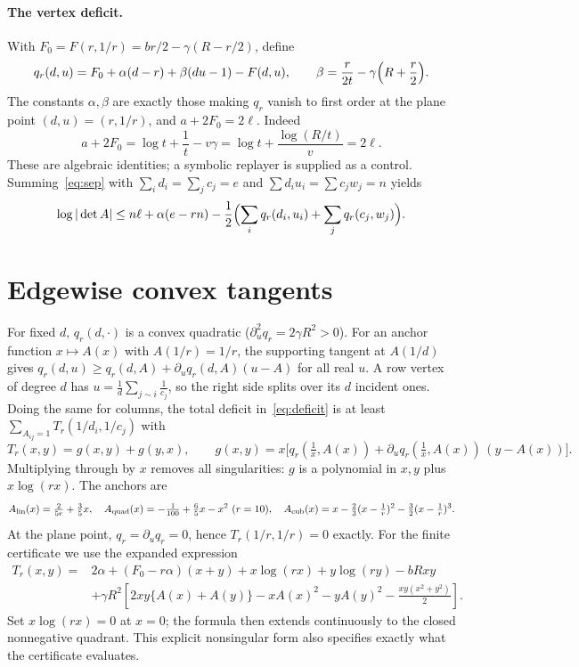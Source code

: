 \documentclass[11pt]{article}
\theoremstyle{remark}
\begin{document}
\paragraph{The vertex deficit.} With
$F_0=F(r,1/r)=br/2-\gamma(R-r/2)$, define
\[
q_r(d,u)=F_0+\alpha(d-r)+\beta(du-1)-F(d,u),\qquad \beta=\frac r{2t}-\gamma\Bigl(R+\frac r2\Bigr).
\]
The constants $\alpha,\beta$ are exactly those making $q_r$ vanish to first order at the plane point
$(d,u)=(r,1/r)$, and $a+2F_0=2\ell$. Indeed
\[
 a+2F_0=\log t+\frac1t-v\gamma
       =\log t+\frac{\log(R/t)}v=2\ell.
\]
These are algebraic identities; a symbolic replayer is supplied as a control.
Summing~\eqref{eq:sep} with $\sum_id_i=\sum_jc_j=e$ and $\sum d_iu_i=\sum c_jw_j=n$ yields
\begin{equation}\label{eq:deficit}
\log|\det A|\le n\ell+\alpha(e-rn)-\frac12\Bigl(\sum_iq_r(d_i,u_i)+\sum_jq_r(c_j,w_j)\Bigr).
\end{equation}

\section{Edgewise convex tangents}
For fixed $d$, $q_r(d,\cdot)$ is a convex quadratic ($\partial_u^2q_r=2\gamma R^2>0$). For an anchor function
$x\mapsto A(x)$ with $A(1/r)=1/r$, the supporting tangent at $A(1/d)$ gives
$q_r(d,u)\ge q_r(d,A)+\partial_uq_r(d,A)(u-A)$ for all real $u$. A row vertex of degree $d$ has
$u=\frac1d\sum_{j\sim i}\frac1{c_j}$, so the right side splits over its $d$ incident ones. Doing the same for
columns, the total deficit in~\eqref{eq:deficit} is at least $\sum_{A_{ij}=1}T_r(1/d_i,1/c_j)$ with
\[
T_r(x,y)=g(x,y)+g(y,x),\qquad g(x,y)=x\bigl[q_r(\tfrac1x,A(x))+\partial_uq_r(\tfrac1x,A(x))\,(y-A(x))\bigr].
\]
Multiplying through by $x$ removes all singularities: $g$ is a polynomial in $x,y$ plus $x\log(rx)$.
The anchors are
\[
A_{\rm lin}(x)=\tfrac{2}{5r}+\tfrac35x,\quad A_{\rm quad}(x)=-\tfrac1{100}+\tfrac65x-x^2\ (r=10),\quad
A_{\rm cub}(x)=x-\tfrac23(x-\tfrac1r)^2-\tfrac32(x-\tfrac1r)^3 .
\]
At the plane point, $q_r=\partial_uq_r=0$, hence $T_r(1/r,1/r)=0$ exactly.
For the finite certificate we use the expanded expression
\begin{align}\label{eq:Texpanded}
T_r(x,y)={}&2\alpha+(F_0-r\alpha)(x+y)+x\log(rx)+y\log(ry)-bRxy\nonumber\\
&+\gamma R^2\left[2xy\{A(x)+A(y)\}-xA(x)^2-yA(y)^2
                              -\frac{xy(x^2+y^2)}2\right].
\end{align}
Set $x\log(rx)=0$ at $x=0$; the formula then extends continuously to the
closed nonnegative quadrant. This explicit nonsingular form also specifies
exactly what the certificate evaluates.
\end{document}
